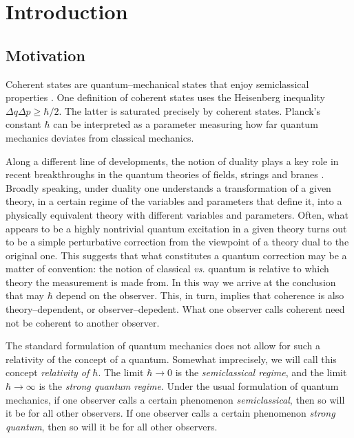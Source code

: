 \documentclass[a4paper,a4paper]{article}
\begin{document}
\section{Introduction}\label{intro}

\subsection{Motivation}\label{moti}

Coherent states are quantum--mechanical states that enjoy semiclassical 
properties \cite{COHST}. One definition of coherent states uses the Heisenberg 
inequality $\Delta q\Delta p \geq \hbar/2$. The latter is saturated precisely 
by coherent states. Planck's constant $\hbar$ can be interpreted 
as a parameter measuring how far quantum mechanics deviates from classical mechanics. 

Along a different line of developments, the notion of duality plays a key role 
in recent breakthroughs in the quantum theories of fields, strings and branes 
\cite{DUALITY, LAG, VAFA}. Broadly speaking, under duality one understands a transformation 
of a given theory, in a certain regime of the variables and parameters that define it, 
into a physically equivalent theory with different variables and parameters. 
Often, what appears to be a highly nontrivial quantum excitation in a given theory 
turns out to be a simple perturbative correction from the viewpoint 
of a theory dual to the original one. This suggests that what constitutes 
a quantum correction may be a matter of convention: the notion of classical 
{\it vs.} quantum is relative to which theory the measurement is made from.  
In this way we arrive at the conclusion that may $\hbar$ depend on the observer. 
This, in turn, implies that coherence is also theory--dependent, or observer--depedent.
What one observer calls coherent need not be coherent to another observer.

The standard formulation of quantum mechanics \cite{GALINDO}
does not allow for such a relativity of the concept of a quantum. 
Somewhat imprecisely, we will call this concept {\it relativity of $\hbar$}. 
The limit $\hbar\to 0$ is the {\it  semiclassical regime}, and the limit $\hbar\to\infty$  
is the {\it  strong quantum regime}. Under the usual formulation of quantum mechanics, 
if one observer calls a certain phenomenon {\it semiclassical}, 
then so will it be for all other observers. If one observer calls 
a certain phenomenon {\it strong quantum}, then so will it be for all other observers.
\end{document}
